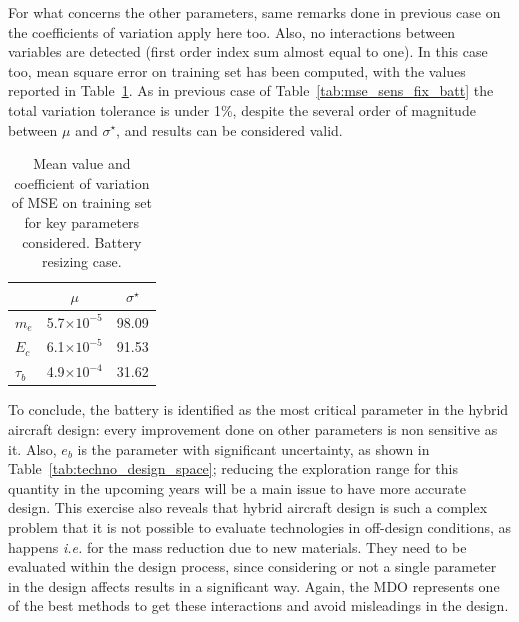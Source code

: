 For what concerns the other parameters, same remarks done in previous case on the coefficients of variation apply here too.
Also, no interactions between variables are detected (first order index sum almost equal to one).
In this case too, mean square error on training set has been computed, with the values reported in Table~\ref{tab:mse_sens_batt_res}. 
As in previous case of Table~\ref{tab:mse_sens_fix_batt} the total variation tolerance is under 1\%, despite the several order of magnitude between $\mu$ and $\sigma^\star$, and results can be considered valid. 
\begin{table}[!h]
	\centering
	\begin{tabular}{l c c}
		\cline{2-3} 
		& $\mu$ & $\sigma^\star$ \\
		\hline
		$m_e$ & 5.7$\times10^{-5}$ & 98.09 \\
		$E_c$ & 6.1$\times10^{-5}$ & 91.53  \\
		$\tau_{b}$ & 4.9$\times10^{-4}$ & 31.62 \\
		\hline
	\end{tabular}
	\caption{Mean value and coefficient of variation of MSE on training set for key parameters considered. Battery resizing case.}
	\label{tab:mse_sens_batt_res}
\end{table} 

To conclude, the battery is identified as the most critical parameter in the hybrid aircraft design: every improvement done on other parameters is non sensitive as it. 
Also, $e_b$ is the parameter with significant uncertainty, as shown in Table~\ref{tab:techno_design_space}; reducing the exploration range for this quantity in the upcoming years will be a main issue to have more accurate design.
This exercise also reveals that hybrid aircraft design is such a complex problem that it is not possible to evaluate technologies in off-design conditions, as happens \textit{i.e.} for the mass reduction due to new materials.
They need to be evaluated within the design process, since considering or not a single parameter in the design affects results in a significant way.
Again, the MDO represents one of the best methods to get these interactions and avoid misleadings in the design. 

